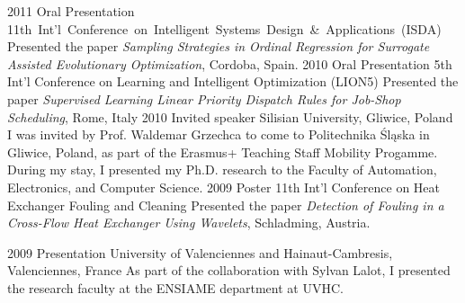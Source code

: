 \documentclass[]{cv} %
\begin{document}
\begin{entrylist}
\entry
{2011}
{Oral Presentation}
{\mbox{11th Int'l Conference on Intelligent Systems Design \& Applications (ISDA)}}
{Presented the paper  \emph{Sampling Strategies in Ordinal Regression for 
Surrogate Assisted Evolutionary Optimization}, Cordoba, Spain.}
\entry
{2010}
{Oral Presentation}
{5th Int'l Conference on Learning and Intelligent Optimization (LION5)}
{Presented the paper \emph{Supervised Learning Linear Priority Dispatch Rules 
for Job-Shop Scheduling}, Rome, Italy}
\entry
{2010}
{Invited speaker}
{Silisian University, Gliwice, Poland}
{I was invited by Prof. Waldemar Grzechca to come to Politechnika Śląska in Gliwice, Poland, as part of the Erasmus+ Teaching Staff Mobility Progamme. During my stay, I presented my Ph.D. research to the Faculty of Automation, Electronics, and Computer Science.}
\entry
{2009}
{Poster}
{11th Int'l Conference on Heat Exchanger Fouling and Cleaning }
{Presented the paper \emph{Detection of Fouling in a Cross-Flow Heat Exchanger Using Wavelets}, Schladming, Austria.}
\end{entrylist}
\begin{entrylist}
\entry
{2009}
{Presentation }
{University of Valenciennes and Hainaut-Cambresis, Valenciennes, France}
{As part of the collaboration with Sylvan Lalot, I presented the research faculty at the ENSIAME department at UVHC.}
\end{entrylist}
\end{document}
